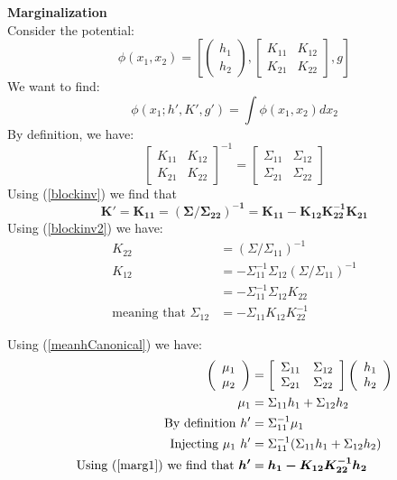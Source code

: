 \documentclass[11pt]{article}
\newcommand{\subsubsubsection}[1]{\noindent\textbf{#1}\\}
\begin{document}
\subsubsubsection{Marginalization}
Consider the potential:
$$
\phi(x_1, x_2) = \left[ \left( \begin{array}{c} h_1 \\ h_2 \end{array} \right), \left[ \begin{array}{cc} K_{11} & K_{12} \\ K_{21} & K_{22} \end{array} \right], g \right]
$$
We want to find:
$$
\phi(x_1; h', K', g') = \int \phi(x_1, x_2)dx_2
$$
By definition, we have:
$$
\left[ \begin{array}{cc} K_{11} & K_{12} \\ K_{21} & K_{22} \end{array} \right]^{-1} = \left[ \begin{array}{cc} \Sigma_{11} & \Sigma_{12} \\ \Sigma_{21} & \Sigma_{22} \end{array} \right]
$$
Using (\ref{blockinv}) we find that 
$$\bm{K'=K_{11}=(\Sigma/\Sigma_{22})^{-1} = K_{11}-K_{12}K_{22}^{-1}K_{21}}$$
Using (\ref{blockinv2}) we have:
\begin{align}
K_{22} &= (\Sigma/\Sigma_{11})^{-1}\nonumber\\
K_{12} &= - \Sigma_{11}^{-1}\Sigma_{12}(\Sigma/\Sigma_{11})^{-1}\nonumber\\
&= - \Sigma_{11}^{-1}\Sigma_{12}K_{22}\nonumber\\
\text{meaning~that~} \Sigma_{12} &= -\Sigma_{11}K_{12}K_{22}^{-1}\label{marg1}
\end{align}

Using (\ref{meanhCanonical}) we have:
\begin{align*}
\left( \begin{array}{c} \mu_1 \\ \mu_2 \end{array} \right) &=
\left[ \begin{array}{cc} \Sigma_{11} & \Sigma_{12} \\ \Sigma_{21} & \Sigma_{22} \end{array} \right] \left( \begin{array}{c} h_1 \\ h_2 \end{array} \right) \\
\mu_1 &= \Sigma_{11}h_1 +  \Sigma_{12}h_2\\
\text{By definition~}h'&= \Sigma_{11}^{-1}\mu_1 \\
\text{Injecting~}\mu_1~h' &=\Sigma_{11}^{-1}(\Sigma_{11}h_1 +  \Sigma_{12}h_2)\\
\text{Using (\ref{marg1}) we find that~}\bm{h'} &= \bm{h_1 -K_{12}K_{22}^{-1}h_2}
\end{align*}
\end{document}
